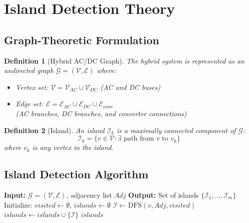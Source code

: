 \documentclass[11pt]{article}
\newtheorem{definition}{Definition}
\begin{document}
\section{Island Detection Theory}

\subsection{Graph-Theoretic Formulation}

\begin{definition}[Hybrid AC/DC Graph]
The hybrid system is represented as an undirected graph $\mathcal{G} = (\mathcal{V}, \mathcal{E})$ where:
\begin{itemize}
    \item Vertex set: $\mathcal{V} = \mathcal{V}_{AC} \cup \mathcal{V}_{DC}$ (AC and DC buses)
    \item Edge set: $\mathcal{E} = \mathcal{E}_{AC} \cup \mathcal{E}_{DC} \cup \mathcal{E}_{conv}$ \\
    (AC branches, DC branches, and converter connections)
\end{itemize}
\end{definition}

\begin{definition}[Island]
An island $\mathcal{I}_k$ is a maximally connected component of $\mathcal{G}$:
\begin{equation}
\mathcal{I}_k = \{v \in \mathcal{V} : \exists \text{ path from } v \text{ to } v_k\}
\end{equation}
where $v_k$ is any vertex in the island.
\end{definition}

\subsection{Island Detection Algorithm}

\begin{algorithm}
\caption{Depth-First Search for Island Detection}
\begin{algorithmic}[1]
\STATE \textbf{Input:} $\mathcal{G} = (\mathcal{V}, \mathcal{E})$, adjacency list $Adj$
\STATE \textbf{Output:} Set of islands $\{\mathcal{I}_1, \ldots, \mathcal{I}_m\}$
\STATE Initialize: $visited \leftarrow \emptyset$, $islands \leftarrow \emptyset$
        \STATE $\mathcal{I} \leftarrow \text{DFS}(v, Adj, visited)$
        \STATE $islands \leftarrow islands \cup \{\mathcal{I}\}$
    \ENDIF
\ENDFOR
\RETURN $islands$
\end{algorithmic}
\end{algorithm}
\end{document}
